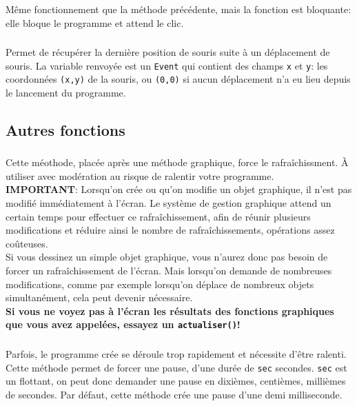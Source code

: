 \documentclass[11pt,a4paper]{article}
\begin{document}
\subsubsection*{}
Même fonctionnement que la méthode précédente, mais la fonction est bloquante: elle bloque le programme et attend le clic.

\subsubsection*{}
Permet de récupérer la dernière position de souris suite à un déplacement de souris. La variable renvoyée est un {\tt Event} qui contient des champs {\tt x} et {\tt y}: les coordonnées {\tt (x,y)} de la souris, ou {\tt (0,0)} si aucun déplacement n'a eu lieu depuis le lancement du programme.


\subsection*{Autres fonctions}

\subsubsection*{}
Cette méothode, placée après une méthode graphique, force le rafraîchissment. \`A utiliser avec modération au risque de ralentir votre programme.\\

{\bf IMPORTANT}: Lorsqu'on crée ou qu'on modifie un objet graphique, il n'est pas modifié immédiatement à l'écran. Le système de gestion graphique attend un certain temps pour effectuer ce rafraîchissement, afin de réunir plusieurs modifications et réduire ainsi le nombre de rafraîchissements, opérations assez coûteuses.\\
Si vous dessinez un simple objet graphique, vous n'aurez donc pas besoin de forcer un rafraîchissement de l'écran. Mais lorsqu'on demande de nombreuses modifications, comme par exemple lorsqu'on déplace de nombreux objets simultanément, cela peut devenir nécessaire.\\
{\bf Si vous ne voyez pas à l'écran les résultats des fonctions graphiques que vous avez appelées, essayez un {\tt actualiser()}!}

\subsubsection*{}
Parfois, le programme crée se déroule trop rapidement et nécessite d'être ralenti. Cette méthode permet de forcer une pause, d'une durée de {\tt sec} secondes. {\tt sec} est un flottant, on peut donc demander une pause en dixièmes, centièmes, millièmes de secondes. Par défaut, cette méthode crée une pause d'une demi milliseconde.
\end{document}
